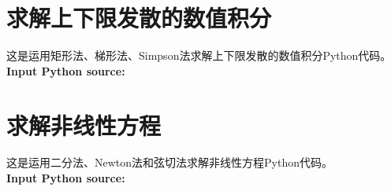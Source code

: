 \documentclass[twoside,twocolumn]{article}
\begin{document}
\begin{CJK*}{UTF8}{gkai}

\newpage
\onecolumn
\begin{appendices}
\section{求解上下限发散的数值积分}
这是运用矩形法、梯形法、Simpson法求解上下限发散的数值积分Python代码。\\
\textbf{\textcolor[rgb]{0.98,0.00,0.00}{Input Python source:}}

\newpage
\section{求解非线性方程}
这是运用二分法、Newton法和弦切法求解非线性方程Python代码。\\
\textbf{\textcolor[rgb]{0.98,0.00,0.00}{Input Python source:}}

\end{appendices}



\end{CJK*}
\end{document}
